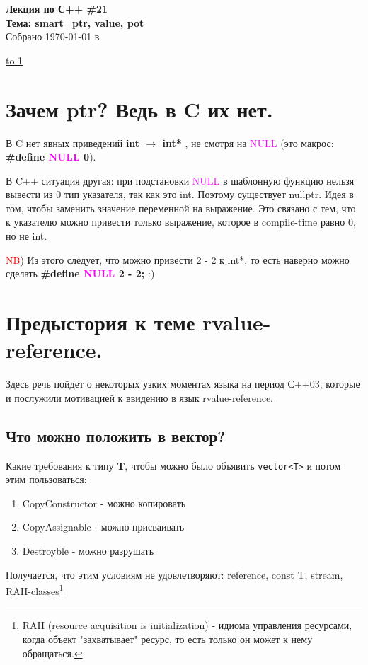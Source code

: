 \documentclass[12pt]{article}
\begin{document}
    \begin{center}

    {\Large \bf Лекция по С++ \#21} \\
    \vspace{0.5em}
    {\Large \bf Тема: smart\_ptr, value, pot} \\
    \vspace{0.5em}
    {\large Собрано {\today} в {\currenttime}}


    \end{center}
\underline{\hbox to 1\textwidth{{ } \hfil{ } \hfil{ } }}

\tableofcontents

\newpage
\section{Зачем ptr? Ведь в C их нет.}
В C нет явных приведений {\bf int $\to$ int* }, не смотря на \textcolor{magenta}{NULL} (это макрос: {\bf \#define \textcolor{magenta}{NULL} 0}).


В C++ ситуация другая: при подстановки \textcolor{magenta}{NULL} в шаблонную функцию нельзя вывести из 0 тип указателя, так как это int. Поэтому существует nullptr. Идея в том, чтобы заменить значение переменной на выражение. Это связано с тем, что к указателю можно привести только выражение, которое в compile-time равно 0, но не int.


\textcolor{red}{NB}) Из этого следует, что можно привести 2 - 2 к int*, то есть наверно можно сделать {\bf \#define \textcolor{magenta}{NULL} 2 - 2; } :)

\section{Предыстория к теме rvalue-reference.}
Здесь речь пойдет о некоторых узких моментах языка на период С++03, которые и послужили мотивацией к ввидению в язык rvalue-reference.
\subsection{Что можно положить в вектор?}
Какие требования к типу {\bf T}, чтобы можно было объявить \texttt{vector<T>} и потом этим пользоваться:
\begin{enumerate}
\item CopyConstructor - можно копировать
\item CopyAssignable - можно присваивать
\item Destroyble - можно разрушать
\end{enumerate}
Получается, что этим условиям не удовлетворяют: reference, const T, stream, RAII-classes\footnote{ RAII (resource acquisition is initialization) - идиома управления ресурсами, когда объект "захватывает" ресурс, то есть только он может к нему обращаться.}
\end{document}
